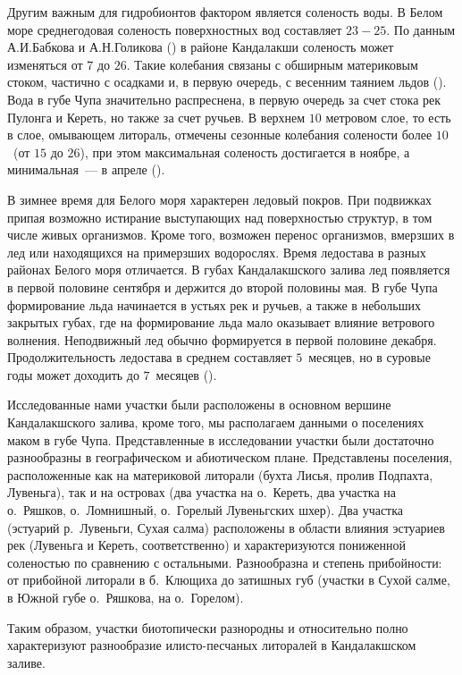 Другим важным для гидробионтов фактором является соленость воды. 
В Белом море среднегодовая соленость поверхностных вод составляет $23-25$\permil. 
По данным А.И.Бабкова и А.Н.Голикова (\cite*{Babkov_Golikov_1984}) в районе Кандалакши соленость может изменяться от $7$ до $26$\permil. 
Такие колебания связаны с обширным материковым стоком, частично с осадками и, в первую очередь, с весенним таянием льдов (\cite{Naumov_Fedyakov_1993}).
Вода в губе Чупа значительно распреснена, в первую очередь за счет стока рек Пулонга и Кереть, но также за счет ручьев. 
В верхнем $10$ метровом слое, то есть в слое, омывающем литораль, отмечены сезонные колебания солености более $10$\permil\ (от $15$ до $26$\permil), при этом максимальная соленость достигается в ноябре, а минимальная~--- в апреле (\cite{Babkov_1982}). 

В зимнее время для Белого моря характерен ледовый покров. 
При подвижках припая возможно истирание выступающих над поверхностью структур, в том числе живых организмов. 
Кроме того, возможен перенос организмов, вмерзших в лед или находящихся на примерзших водорослях.
 Время ледостава в разных районах Белого моря отличается. 
В губах Кандалакшского залива лед появляется в первой половине сентября и держится до второй половины мая. 
В губе Чупа формирование льда начинается в устьях рек и ручьев, а также в небольших закрытых губах, где на формирование льда мало оказывает влияние ветрового волнения. 
Неподвижный лед обычно формируется в первой половине декабря. 
Продолжительность ледостава в среднем составляет $5$~месяцев, но в суровые годы может доходить до $7$~месяцев (\cite{Babkov_Golikov_1984}). 

Исследованные нами участки были расположены в основном вершине Кандалакшского залива, кроме того, мы располагаем данными о поселениях маком в губе Чупа. 
Представленные в исследовании участки были достаточно разнообразны в географическом и абиотическом плане.
Представлены поселения, расположенные как на материковой литорали (бухта Лисья, пролив Подпахта, Лувеньга), так и на островах (два участка на о.~Кереть, два участка на о.~Ряшков, о.~Ломнишный, о.~Горелый Лувеньгских шхер). 
Два участка (эстуарий р.~Лувеньги, Сухая салма) расположены в области влияния эстуариев рек (Лувеньга и Кереть, соответственно)  и характеризуются пониженной соленостью по сравнению с остальными.
Разнообразна и степень прибойности: от прибойной литорали в б.~Клющиха до затишных губ (участки в Сухой салме, в Южной губе о.~Ряшкова, на о.~Горелом).

Таким образом, участки биотопически разнородны и относительно полно характеризуют разнообразие илисто-песчаных литоралей в Кандалакшском заливе.

